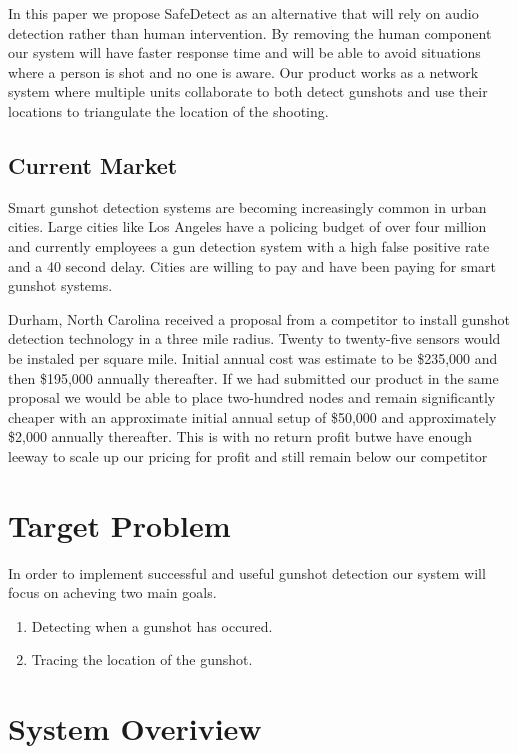\documentclass[conference]{IEEEtran}
\begin{document}
In this paper we propose SafeDetect as an alternative that will rely on audio detection rather than human intervention. By removing the human component our system will have faster response time and will be able to avoid situations where a person is shot and no one is aware. Our product works as a network system where multiple units collaborate to both detect gunshots and use their locations to triangulate the location of the shooting.

\subsection{Current Market}

Smart gunshot detection systems are becoming increasingly common in urban cities. Large cities like Los Angeles have a policing budget of over four million and currently employees a gun detection system with a high false positive rate and a 40 second delay. Cities are willing to pay and have been paying for smart gunshot systems.

Durham, North Carolina received a proposal from a competitor to install gunshot detection technology in a three mile radius. Twenty to twenty-five sensors would be instaled per square mile. Initial annual cost was estimate to be \$235,000 and then \$195,000 annually thereafter.
If we had submitted our product in the same proposal we would be able to place two-hundred nodes and remain significantly cheaper with an approximate initial annual setup of \$50,000 and approximately \$2,000 annually thereafter. This is with no return profit butwe have enough leeway to scale up our pricing for profit and still remain below our competitor

\section{Target Problem}

In order to implement successful and useful gunshot detection our system will focus on acheving two main goals.
\begin{enumerate}
\item Detecting when a gunshot has occured.
\item Tracing the location of the gunshot.
\end{enumerate}


\section{System Overiview}
\end{document}
